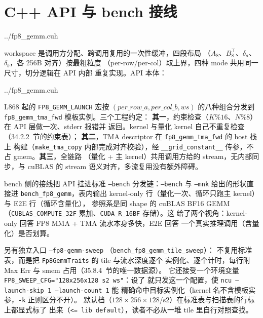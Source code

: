 \section{C++ API 与 bench 接线}\label{sec:35-api}

\begin{lstinputlisting}[linerange={831-845},firstnumber=auto,
  title={fp8\_gemm.cuh L831-845（workspace 布局：四段 256B 对齐）}]{../fp8_gemm.cuh}
\end{lstinputlisting}

workspace 是调用方分配、跨调用复用的一次性缓冲，四段布局
（$A_8$、$B_8^{\top}$、$\delta_a$、$\delta_b$，各 256B 对齐）按最粗粒度
（per-row/per-col）取上界，四种 mode 共用同一尺寸，切分逻辑在 API 内部
重复实现。API 本体：

\begin{lstinputlisting}[linerange={847-901},firstnumber=auto,
  title={fp8\_gemm.cuh L847-901（fp8\_gemm\_bf16：约束自检 + workspace 切分 + mode 分发）}]{../fp8_gemm.cuh}
\end{lstinputlisting}

L868 起的 \texttt{FP8\_GEMM\_LAUNCH} 宏按 $(per\_row\_a, per\_col\_b, ws)$
的八种组合分发到 \texttt{fp8\_gemm\_tma\_fwd} 模板实例。三个工程约定：
\textbf{其一}，约束检查（$K\%16$、$N\%8$）在 API 层做一次、stderr 报错并
返回。kernel 与量化 kernel 自己不重复检查（34.2.2~节的约束表）；
\textbf{其二}，TMA descriptor 在 \texttt{fp8\_gemm\_tma\_fwd} 的 host 栈上
构建（\texttt{make\_tma\_copy} 内部完成对齐校验），经
\texttt{\_\_grid\_constant\_\_} 传参，不占 gmem。\textbf{其三}，全链路
（量化 + 主 kernel）共用调用方给的 stream，无内部同步，与 cuBLAS 的
stream 语义对齐，多流复用没有额外障碍。

bench 侧的接线把 API 挂进标准 \texttt{--bench} 分发链：\texttt{--bench}
与 \texttt{--mnk} 给出的形状直接进 \texttt{bench\_fp8\_gemm}，表内输出
kernel-only 行（量化一次、循环只跑主 kernel）与 E2E 行（循环含量化），
参照系是同 shape 的 cuBLAS BF16 GEMM
（\texttt{CUBLAS\_COMPUTE\_32F} 累加、\texttt{CUDA\_R\_16BF} 存储）。这
给了两个视角：kernel-only 回答 FP8 MMA + TMA 流水本身多快，E2E 回答
一个真实推理调用（含量化）是否划算。

另有独立入口 \texttt{--fp8-gemm-sweep}
（\texttt{bench\_\allowbreak{}fp8\_\allowbreak{}gemm\_\allowbreak{}tile\_\allowbreak{}sweep}）：
不复用标准表，而是把 \texttt{Fp8GemmTraits} 的 tile 与流水深度逐个
实例化、逐个计时，每行附 Max Err 与 smem 占用（35.8.4~节的唯一数据源）。
它还接受一个环境变量
\texttt{FP8\_\allowbreak{}SWEEP\_\allowbreak{}CFG="128x256x128 s2 ws"}：设了
就只发这一个配置，使
\texttt{ncu --launch-\allowbreak{}skip 1 --launch-\allowbreak{}count 1} 能
精确命中目标实例化（kernel 名不含模板实参，\texttt{-k} 正则区分不开）。
默认档（$128\times256\times128$/s2）在标准表与扫描表的行标上都显式标了
出来（\texttt{<= lib default}），读者不必从一堆 tile 里自行对照查找。

